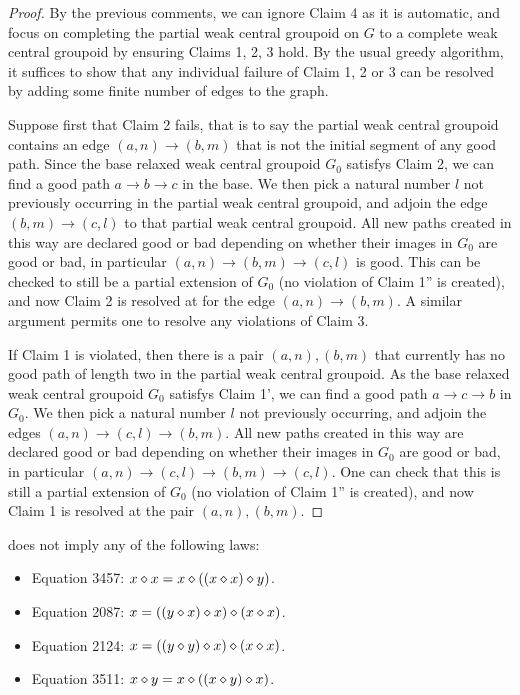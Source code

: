 \begin{proof}
  By the previous comments, we can ignore Claim 4 as it is automatic, and focus on completing the partial weak central groupoid on $G$ to a complete weak central groupoid by ensuring Claims 1, 2, 3 hold. By the usual greedy algorithm, it suffices to show that any individual failure of Claim 1, 2 or 3 can be resolved by adding some finite number of edges to the graph.

  Suppose first that Claim 2 fails, that is to say the partial weak central groupoid contains an edge $(a,n) \to (b,m)$ that is not the initial segment of any good path. Since the base relaxed weak central groupoid $G_0$ satisfys Claim 2, we can find a good path $a \to b \to c$ in the base. We then pick a natural number $l$ not previously occurring in the partial weak central groupoid, and adjoin the edge $(b,m) \to (c,l)$ to that partial weak central groupoid. All new paths created in this way are declared good or bad depending on whether their images in $G_0$ are good or bad, in particular $(a,n) \to (b,m) \to (c,l)$ is good. This can be checked to still be a partial extension of $G_0$ (no violation of Claim 1'' is created), and now Claim 2 is resolved at for the edge $(a,n) \to (b,m)$. A similar argument permits one to resolve any violations of Claim 3.

  If Claim 1 is violated, then there is a pair $(a,n), (b,m)$ that currently has no good path of length two in the partial weak central groupoid. As the base relaxed weak central groupoid $G_0$ satisfys Claim 1', we can find a good path $a \to c \to b$ in $G_0$. We then pick a natural number $l$ not previously occurring, and adjoin the edges $(a,n) \to (c,l) \to (b,m)$. All new paths created in this way are declared good or bad depending on whether their images in $G_0$ are good or bad, in particular $(a,n) \to (c,l) \to (b,m) \to (c,l)$. One can check that this is still a partial extension of $G_0$ (no violation of Claim 1'' is created), and now Claim 1 is resolved at the pair $(a,n), (b,m)$.
\end{proof}

\begin{theorem}\label{1485-refutes}\leanok{}
   does not imply any of the following laws:
  \begin{itemize}
   \item Equation 3457: $x \diamond x = x \diamond ((x \diamond x) \diamond y)$.
   \item Equation 2087: $x = ((y \diamond x) \diamond x) \diamond (x \diamond x)$.
   \item Equation 2124: $x = ((y \diamond y) \diamond x) \diamond (x \diamond x)$.
   \item Equation 3511: $x \diamond y = x \diamond ((x \diamond y) \diamond x)$.
  \end{itemize}
\end{theorem}

